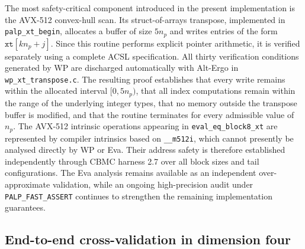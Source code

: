 \documentclass[appliedmath,article,submit,moreauthors]{Definitions/mdpi}
\begin{document}
The most safety-critical component introduced in the present implementation is
the AVX-512 convex-hull scan. Its struct-of-arrays transpose, implemented in
\nolinkurl{palp\_xt\_begin}, allocates a buffer of size \(5n_p\) and writes
entries of the form \(\texttt{xt}[kn_p+j]\). Since this routine performs
explicit pointer arithmetic, it is verified separately using a complete ACSL
specification. All thirty verification conditions generated by WP are discharged
automatically with Alt-Ergo in \nolinkurl{wp\_xt\_transpose.c}. The resulting
proof establishes that every write remains within the allocated interval
\([0,5n_p)\), that all index computations remain within the range of the
underlying integer types, that no memory outside the transpose buffer is
modified, and that the routine terminates for every admissible value of \(n_p\).
The AVX-512 intrinsic operations appearing in \nolinkurl{eval\_eq\_block8\_xt}
are represented by compiler intrinsics based on \nolinkurl{\_\_m512i}, which
cannot presently be analysed directly by WP or Eva. Their address safety is
therefore established independently through CBMC harness 2.7 over all block
sizes and tail configurations. The Eva analysis remains available as an
independent over-approximate validation, while an ongoing high-precision audit
under \nolinkurl{PALP\_FAST\_ASSERT} continues to strengthen the remaining
implementation guarantees.

\subsection{End-to-end cross-validation in dimension four}
\label{sec:verification-d4}
\end{document}
